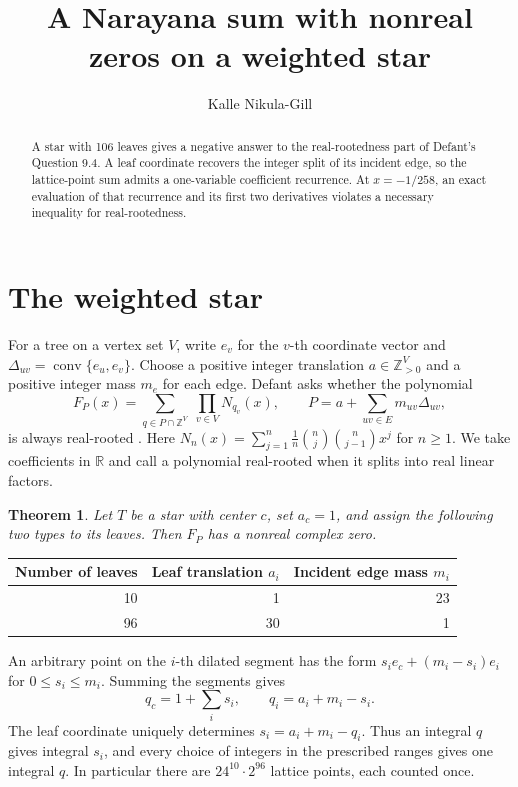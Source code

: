 \documentclass[11pt]{article}
\title{A Narayana sum with nonreal zeros on a weighted star}
\author{Kalle Nikula-Gill}
\date{}
\newtheorem{theorem}{Theorem}
\newcommand{\Z}{\mathbb Z}
\newcommand{\R}{\mathbb R}
\begin{document}
\maketitle
\begin{abstract}
A star with 106 leaves gives a negative answer to the real-rootedness part of Defant's Question 9.4. A leaf coordinate recovers the integer split of its incident edge, so the lattice-point sum admits a one-variable coefficient recurrence. At \(x=-1/258\), an exact evaluation of that recurrence and its first two derivatives violates a necessary inequality for real-rootedness.
\end{abstract}

\section{The weighted star}
For a tree on a vertex set \(V\), write \(e_v\) for the \(v\)-th coordinate vector and
\(\Delta_{uv}=\operatorname{conv}\{e_u,e_v\}\). Choose a positive integer translation
\(a\in\Z_{>0}^V\) and a positive integer mass \(m_e\) for each edge. Defant asks whether the polynomial
\[
 F_P(x)=\sum_{q\in P\cap\Z^V}\;\prod_{v\in V} N_{q_v}(x),
 \qquad P=a+\sum_{uv\in E}m_{uv}\Delta_{uv},
\]
is always real-rooted \cite[Question 9.4]{defant}. Here
\(N_n(x)=\sum_{j=1}^n\frac1n\binom nj\binom n{j-1}x^j\) for \(n\ge1\).
We take coefficients in \(\R\) and call a polynomial real-rooted when it splits into real linear factors.

\begin{theorem}
Let \(T\) be a star with center \(c\), set \(a_c=1\), and assign the following two types to its leaves. Then \(F_P\) has a nonreal complex zero.
\end{theorem}
\begin{center}
\begin{tabular}{rrr}\toprule
Number of leaves & Leaf translation \(a_i\) & Incident edge mass \(m_i\)\\\midrule
10 & 1 & 23\\
96 & 30 & 1\\\bottomrule
\end{tabular}
\end{center}
An arbitrary point on the \(i\)-th dilated segment has the form
\(s_i e_c+(m_i-s_i)e_i\) for \(0\le s_i\le m_i\). Summing the segments gives
\begin{equation}
 q_c=1+\sum_i s_i,\qquad q_i=a_i+m_i-s_i.                         \label{eq:coord}
\end{equation}
The leaf coordinate uniquely determines \(s_i=a_i+m_i-q_i\). Thus an integral \(q\) gives integral \(s_i\), and every choice of integers in the prescribed ranges gives one integral \(q\). In particular there are \(24^{10}\cdot2^{96}\) lattice points, each counted once.
\end{document}
